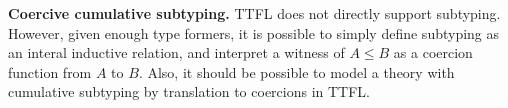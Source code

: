 \documentclass[a4paper,UKenglish,cleveref, autoref, thm-restate]{lipics-v2021}
\theoremstyle{remark}
\theoremstyle{definition}
\newcommand{\U}{\mathsf{U}}
\newcommand{\Lift}{\mathsf{Lift}}
\renewcommand{\U}{\mathsf{U}}
\begin{document}
\textbf{Coercive cumulative subtyping.} TTFL does not directly support
subtyping. However, given enough type formers, it is possible to simply define
subtyping as an interal inductive relation, and interpret a witness of $A \leq B$ as
a coercion function from $A$ to $B$. Also, it should be possible to model a
theory with cumulative subtyping by translation to coercions in TTFL.





























\end{document}
